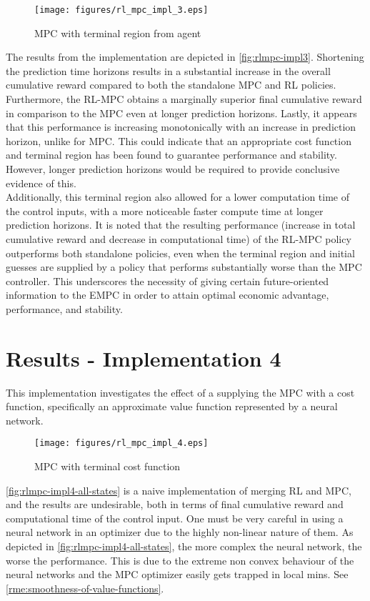 \begin{figure}[H]
	\centering
	\texttt{[image: figures/rl\_mpc\_impl\_3.eps]}
	\caption{MPC with terminal region from agent}
	\label{fig:rlmpc-impl3}
\end{figure}

The results from the implementation are depicted in \autoref{fig:rlmpc-impl3}. Shortening the prediction time horizons results in a substantial increase in the overall cumulative reward compared to both the standalone MPC and RL policies. Furthermore, the RL-MPC obtains a marginally superior final cumulative reward in comparison to the MPC even at longer prediction horizons. Lastly, it appears that this performance is increasing monotonically with an increase in prediction horizon, unlike for MPC. This could indicate that an appropriate cost function and terminal region has been found to  guarantee performance and stability. However, longer prediction horizons would be required to provide conclusive evidence of this.\\

Additionally, this terminal region also allowed for a lower computation time of the control inputs, with a more noticeable faster compute time at longer prediction horizons. It is noted that the resulting performance (increase in total cumulative reward and decrease in computational time) of the RL-MPC policy outperforms both standalone policies, even when the terminal region and initial guesses are supplied by a policy that performs substantially worse than the MPC controller. This underscores the necessity of giving certain future-oriented information to the EMPC in order to attain optimal economic advantage, performance, and stability. 

\section{Results - Implementation 4}
This implementation investigates the effect of a supplying the MPC with a cost function, specifically an approximate value function represented by a neural network.


\begin{figure}[H]
	\centering
	\texttt{[image: figures/rl\_mpc\_impl\_4.eps]}
	\caption{MPC with terminal cost function}
	\label{fig:rlmpc-impl4-all-states}
\end{figure}
\autoref{fig:rlmpc-impl4-all-states} is a naive implementation of merging RL and MPC, and the results are undesirable, both in terms of final cumulative reward and computational time of the control input. One must be very careful in using a neural network in an optimizer due to the highly non-linear nature of them. As depicted in \autoref{fig:rlmpc-impl4-all-states}, the more complex the neural network, the worse the performance. This is due to the extreme non convex behaviour of the neural networks and the MPC optimizer easily gets trapped in local mins. See \autoref{rme:smoothness-of-value-functions}.

